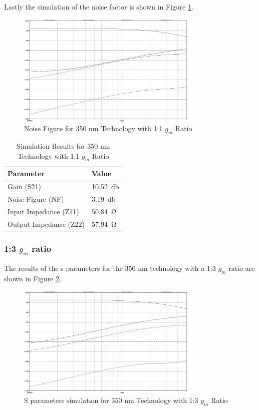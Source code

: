 Lastly the simulation of the noise factor is shown in Figure \ref{fig:350nm_1to1-NF}.
\begin{figure}[H]
    \centering
    \includegraphics[width=0.8\textwidth]{Images/3501to1SParam.png}
    \caption{Noise Figure for 350 nm Technology with 1:1 $g_m$ Ratio}
    \label{fig:350nm_1to1-NF}
\end{figure}

\begin{table}[H]
    \centering
    \caption{Simulation Results for 350 nm Technology with 1:1 $g_m$ Ratio}
    \begin{tabularx}{\textwidth}{>{\centering\arraybackslash}X >{\centering\arraybackslash}X }
        \toprule
        \textbf{Parameter} & \textbf{Value}\\
        \midrule
        Gain (S21) & \SI{10.52}{\decibel} \\
        \midrule
        Noise Figure (NF) & \SI{3.19}{\decibel} \\
        \midrule
        Input Impedance (Z11) & \SI{50.84}{\ohm} \\
        \midrule
        Output Impedance (Z22) & \SI{57.94}{\ohm} \\
        \bottomrule
    \end{tabularx}
    \label{tab:350nm_1to1_results}
\end{table}
\subsubsection{1:3 $g_m$ ratio}

The results of the s parameters for the 350 nm technology with a 1:3 $g_m$ ratio are shown in Figure \ref{fig:350nm_1ton}. 
\begin{figure}[H]
    \centering
    \includegraphics[width=0.8\textwidth]{Images/3501to3SParam.png}
    \caption{S parameters simulation for 350 nm Technology with 1:3 $g_m$ Ratio}
    \label{fig:350nm_1ton}
\end{figure}

